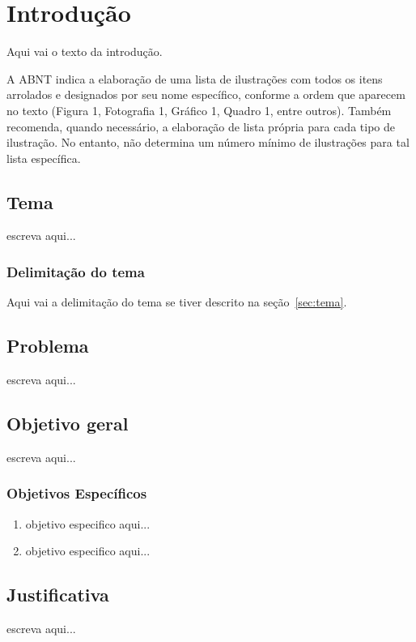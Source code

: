 \chapter[\label{ch:intro}Introdução]{Introdução}
Aqui vai o texto da introdução.  

A ABNT indica a elaboração de uma lista de ilustrações com todos os itens arrolados e designados por seu nome específico, conforme a ordem que aparecem no texto (Figura 1, Fotografia 1, Gráfico 1, Quadro 1, entre outros). Também recomenda, quando necessário, a elaboração de lista própria para cada tipo de ilustração. No entanto, não determina um número mínimo de ilustrações para tal lista específica.

\section{\label{sec:tema}Tema}

escreva aqui...

\subsection{\label{sec:deltema}Delimitação do tema}
Aqui vai a delimitação do tema se tiver descrito na seção~\ref{sec:tema}.




\section{\label{sec:probPesquisa}Problema}
escreva aqui...

\section{\label{sec:objGeral}Objetivo geral}
escreva aqui...

\subsection{\label{sec:objEsp}Objetivos Específicos}
\begin{enumerate}
	\item objetivo especifico aqui...
	\item objetivo especifico aqui...
\end{enumerate}

\section{\label{sec:just}Justificativa}
escreva aqui...

